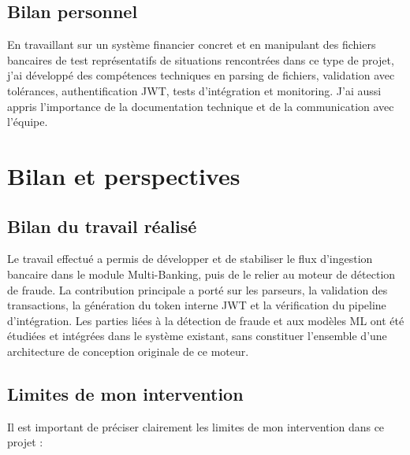 \documentclass[12pt,a4paper]{extreport}
\begin{document}
\section{Bilan personnel}

En travaillant sur un système financier concret et en manipulant des fichiers bancaires de test représentatifs de situations rencontrées dans ce type de projet, j'ai développé des compétences techniques en parsing de fichiers, validation avec tolérances, authentification JWT, tests d'intégration et monitoring. J'ai aussi appris l'importance de la documentation technique et de la communication avec l'équipe.

\chapter{Bilan et perspectives}

\section{Bilan du travail réalisé}

Le travail effectué a permis de développer et de stabiliser le flux d'ingestion bancaire dans le module Multi-Banking, puis de le relier au moteur de détection de fraude. La contribution principale a porté sur les parseurs, la validation des transactions, la génération du token interne JWT et la vérification du pipeline d'intégration. Les parties liées à la détection de fraude et aux modèles ML ont été étudiées et intégrées dans le système existant, sans constituer l'ensemble d'une architecture de conception originale de ce moteur.

\section{Limites de mon intervention}

Il est important de préciser clairement les limites de mon intervention dans ce projet :
\end{document}
